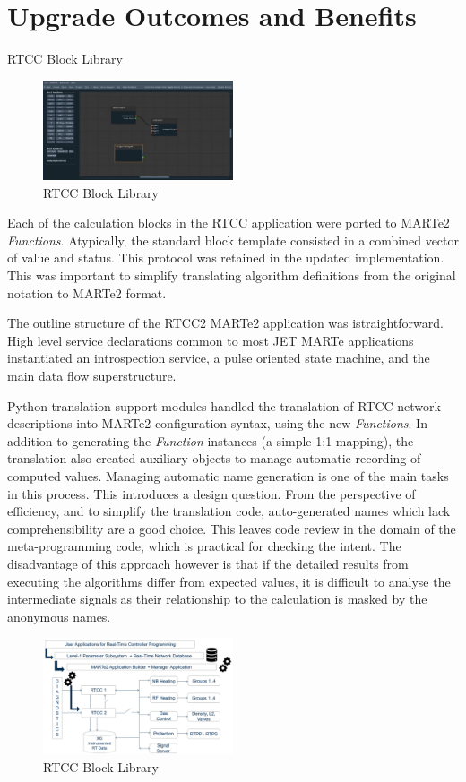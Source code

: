 \documentclass[5p]{elsarticle}
\begin{document}
\section{Upgrade Outcomes and Benefits}
RTCC Block Library
\begin{figure}[t]%
\centering
	\includegraphics[width=0.5\textwidth]{GUI.PNG}
\caption{RTCC Block Library}\label{fig6}
\end{figure}
Each of the calculation blocks in the RTCC application were ported to MARTe2 {\em Functions}.
Atypically, the standard block template consisted in a combined vector of value and status.
This protocol was retained in the updated implementation. This was important to simplify
translating algorithm definitions from the original notation to MARTe2 format.

The outline structure of the RTCC2 MARTe2 application was istraightforward.
High level service declarations common to most JET MARTe applications
instantiated an introspection service, a pulse oriented state machine, 
and the main data flow superstructure.

Python translation support modules handled the translation of RTCC network 
descriptions into MARTe2 configuration syntax, using the new {\em Functions}.
In addition to generating the {\em Function} instances (a simple 1:1 mapping),
the translation also created auxiliary objects to manage automatic
recording of computed values.  Managing automatic name generation is one
of the main tasks in this process.  This introduces a design question.  From
the perspective of efficiency, and to simplify the translation code, 
auto-generated names which lack comprehensibility are a good choice. 
This leaves code review in the domain of the meta-programming code, 
which is practical for checking the intent.  The disadvantage of this
approach however is that if the detailed results from executing the 
algorithms differ from expected values, it is difficult to analyse
the intermediate signals as their relationship to the calculation is
masked by the anonymous names.


\begin{figure}[t!]%
\centering
\includegraphics[width=0.5\textwidth]{R1R2ARCH.PNG}
\caption{RTCC Block Library}\label{fig5}
\end{figure}
\end{document}
